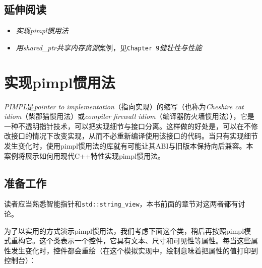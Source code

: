 
\subsection{延伸阅读}



\begin{itemize}
\item \textit{实现pimpl惯用法}



\item \textit{用shared\_ptr共享内存资源}案例，见\texttt{Chapter 9}\textit{健壮性与}\textit{性能}

\end{itemize}



\section{实现pimpl惯用法}



\textit{PIMPL}是\textit{pointer to implementation}（指向实现）的缩写（也称为\textit{Cheshire cat idiom}（柴郡猫惯用法）或\textit{compiler firewall idiom}（编译器防火墙惯用法）），它是一种不透明指针技术，可以把实现细节与接口分离。这样做的好处是，可以在不修改接口的情况下改变实现，从而不必重新编译使用该接口的代码。当只有实现细节发生变化时，使用pimpl惯用法的库就有可能让其ABI与旧版本保持向后兼容。本案例将展示如何用现代C++特性实现pimpl惯用法。



\subsection{准备工作}



读者应当熟悉智能指针和\texttt{std::\allowbreak{}string\_\allowbreak{}view}，本书前面的章节对这两者都有讨论。



为了以实用的方式演示pimpl惯用法，我们考虑下面这个类，稍后再按照pimpl模式重构它。这个类表示一个控件，它具有文本、尺寸和可见性等属性。每当这些属性发生变化时，控件都会重绘（在这个模拟实现中，绘制意味着把属性的值打印到控制台）：



